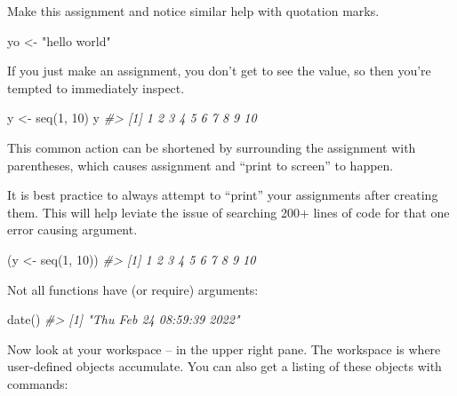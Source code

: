 \documentclass[
]{book}
\newenvironment{Shaded}{\begin{snugshade}}{\end{snugshade}}
\newcommand{\CommentTok}[1]{\textcolor[rgb]{0.56,0.35,0.01}{\textit{#1}}}
\newcommand{\DecValTok}[1]{\textcolor[rgb]{0.00,0.00,0.81}{#1}}
\newcommand{\FunctionTok}[1]{\textcolor[rgb]{0.00,0.00,0.00}{#1}}
\newcommand{\NormalTok}[1]{#1}
\newcommand{\OtherTok}[1]{\textcolor[rgb]{0.56,0.35,0.01}{#1}}
\newcommand{\StringTok}[1]{\textcolor[rgb]{0.31,0.60,0.02}{#1}}
\begin{document}
Make this assignment and notice similar help with quotation marks.

\begin{Shaded}
\begin{Highlighting}[]
\NormalTok{yo }\OtherTok{\textless{}{-}} \StringTok{"hello world"}
\end{Highlighting}
\end{Shaded}

If you just make an assignment, you don't get to see the value, so then you're tempted to immediately inspect.

\begin{Shaded}
\begin{Highlighting}[]
\NormalTok{y }\OtherTok{\textless{}{-}} \FunctionTok{seq}\NormalTok{(}\DecValTok{1}\NormalTok{, }\DecValTok{10}\NormalTok{)}
\NormalTok{y}
\CommentTok{\#\textgreater{}  [1]  1  2  3  4  5  6  7  8  9 10}
\end{Highlighting}
\end{Shaded}

This common action can be shortened by surrounding the assignment with parentheses, which causes assignment and ``print to screen'' to happen.

It is best practice to always attempt to ``print'' your assignments after creating them. This will help leviate the issue of searching 200+ lines of code for that one error causing argument.

\begin{Shaded}
\begin{Highlighting}[]
\NormalTok{(y }\OtherTok{\textless{}{-}} \FunctionTok{seq}\NormalTok{(}\DecValTok{1}\NormalTok{, }\DecValTok{10}\NormalTok{))}
\CommentTok{\#\textgreater{}  [1]  1  2  3  4  5  6  7  8  9 10}
\end{Highlighting}
\end{Shaded}

Not all functions have (or require) arguments:

\begin{Shaded}
\begin{Highlighting}[]
\FunctionTok{date}\NormalTok{()}
\CommentTok{\#\textgreater{} [1] "Thu Feb 24 08:59:39 2022"}
\end{Highlighting}
\end{Shaded}

Now look at your workspace -- in the upper right pane. The workspace is where user-defined objects accumulate. You can also get a listing of these objects with commands:
\end{document}
